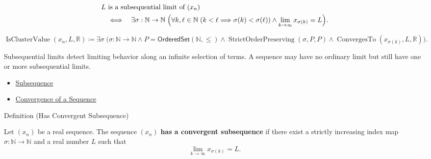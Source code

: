\begin{remark*}
\[
\begin{aligned}
&L\text{ is a subsequential limit of }(x_n)\\
&\quad\Longleftrightarrow\quad
\exists \sigma:\mathbb{N}\to\mathbb{N}\;
\Bigl(
  \forall k,\ell\in\mathbb{N}\;(k<\ell\Longrightarrow \sigma(k)<\sigma(\ell))
  \land
  \lim_{k\to\infty}x_{\sigma(k)}=L
\Bigr).
\end{aligned}
\]
\end{remark*}

\begin{remark*}
\[
\operatorname{IsClusterValue}(x_n,L,\mathbb{R})
\coloneqq
\exists \sigma\;
\bigl(
  \sigma\colon\mathbb{N}\to\mathbb{N}
  \land
  P=\mathsf{OrderedSet}(\mathbb{N},\leq)
  \land
  \operatorname{StrictOrderPreserving}(\sigma,P,P)
  \land
  \operatorname{ConvergesTo}(x_{\sigma(k)},L,\mathbb{R})
\bigr).
\]
\end{remark*}

\begin{remark*}[Interpretation]
Subsequential limits detect limiting behavior along an infinite selection of
terms. A sequence may have no ordinary limit but still have one or more
subsequential limits.
\end{remark*}

\begin{dependencies}
\begin{itemize}
  \item \hyperref[def:subsequence-of-sequence]{Subsequence}
  \item \hyperref[def:convergent-sequence]{Convergence of a Sequence}
\end{itemize}
\end{dependencies}


\begin{definitionbox}{Definition (Has Convergent Subsequence)}
\begin{definition}
\label{def:has-convergent-subsequence}
Let $(x_n)$ be a real sequence. The sequence $(x_n)$ \textbf{has a
convergent subsequence} if there exist a strictly increasing index map
$\sigma:\mathbb{N}\to\mathbb{N}$ and a real number $L$ such that
\[
  \lim_{k\to\infty}x_{\sigma(k)}=L.
\]
\end{definition}
\end{definitionbox}


